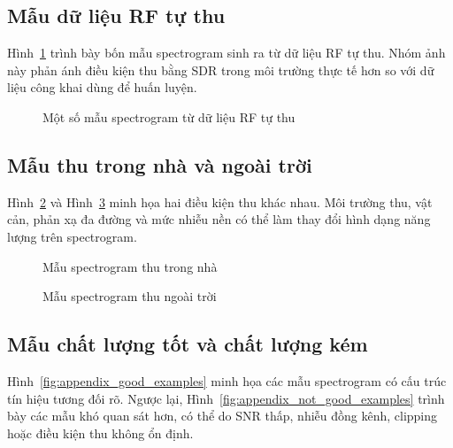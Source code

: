 \documentclass[../DoAn.tex]{subfiles}
\begin{document}
\subsection*{Mẫu dữ liệu RF tự thu}

Hình~\ref{fig:appendix_self_collected} trình bày bốn mẫu spectrogram sinh ra từ dữ liệu RF tự thu. Nhóm ảnh này phản
ánh điều kiện thu bằng SDR trong môi trường thực tế hơn so với dữ liệu công khai dùng để huấn luyện.

\begin{figure}[H]
    \centering
    \hfill
    \hfill
    \hfill
    \caption{Một số mẫu spectrogram từ dữ liệu RF tự thu}
    \label{fig:appendix_self_collected}
\end{figure}

\subsection*{Mẫu thu trong nhà và ngoài trời}

Hình~\ref{fig:appendix_indoor} và Hình~\ref{fig:appendix_outdoor} minh họa hai điều kiện thu khác nhau. Môi trường thu,
vật cản, phản xạ đa đường và mức nhiễu nền có thể làm thay đổi hình dạng năng lượng trên spectrogram.

\begin{figure}[H]
    \centering
    \caption{Mẫu spectrogram thu trong nhà}
    \label{fig:appendix_indoor}
\end{figure}

\begin{figure}[H]
    \centering
    \caption{Mẫu spectrogram thu ngoài trời}
    \label{fig:appendix_outdoor}
\end{figure}

\subsection*{Mẫu chất lượng tốt và chất lượng kém}

Hình~\ref{fig:appendix_good_examples} minh họa các mẫu spectrogram có cấu trúc tín hiệu tương đối rõ. Ngược lại,
Hình~\ref{fig:appendix_not_good_examples} trình bày các mẫu khó quan sát hơn, có thể do SNR thấp, nhiễu đồng kênh,
clipping hoặc điều kiện thu không ổn định.
\end{document}
